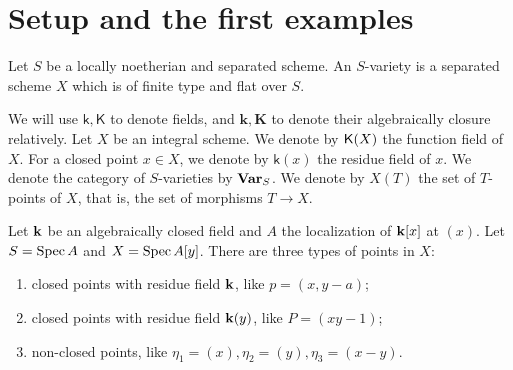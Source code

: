 \section{Setup and the first examples}

    Let $S$ be a locally noetherian and separated scheme.
    An $S$-variety is a separated scheme $X$ which is of finite type and flat over $S$.

    We will use $\mathsf{k},\mathsf{K}$ to denote fields, and $\mathbf{k},\mathbf{K}$ to denote their algebraically closure relatively.
    Let $X$ be an integral scheme.
    We denote by $\mathsf{K}(X)$ the function field of $X$.
    For a closed point $x \in X$, we denote by $\mathsf{k}(x)$ the residue field of $x$.
    We denote the category of $S$-varieties by $\mathbf{Var}_S$.
    We denote by $X(T)$ the set of $T$-points of $X$, that is, the set of morphisms $T \to X$.


\begin{example}
    Let $\mathbf{k}$ be an algebraically closed field and $A$ the localization of $\mathbf{k}[x]$ at $(x)$.
    Let $S = \operatorname{Spec} A$ and $X = \operatorname{Spec} A[y]$. 
    There are three types of points in $X$:
    \begin{enumerate}[label=(\roman*)]
        \item closed points with residue field $\mathbf{k}$, like $p = (x,y-a)$;
        \item closed points with residue field $\mathbf{k}(y)$, like $P = (xy-1)$;
        \item non-closed points, like $\eta_1 = (x),\eta_2 = (y),\eta_3 = (x-y)$.
    \end{enumerate}

\end{example}
